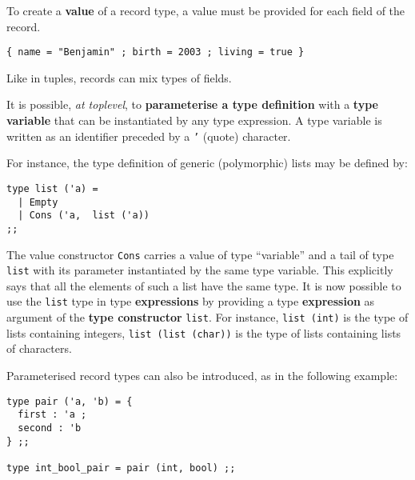 \vspace{0.2cm}

To create a {\bf value} of a record type, a value
must be provided for each field of the record.
{\scriptsize
\begin{lstlisting}
{ name = "Benjamin" ; birth = 2003 ; living = true }
\end{lstlisting}
}
Like in tuples, records can mix types of fields.

\vspace{0.5cm}

It is possible, {\em at toplevel}, to {\bf parameterise a type
  definition} with a {\bf type variable} that
can be instantiated by any type expression. A type variable is written
as an identifier preceded by a {\tt '} (quote) character.

 For instance, the type
definition of generic (polymorphic) lists may be defined by:

{\scriptsize
\begin{lstlisting}
type list ('a) =
  | Empty
  | Cons ('a,  list ('a))
;;
\end{lstlisting}
}

The value
constructor {\tt Cons} carries a value of type ``variable''
and a tail of type
{\tt list} with its parameter instantiated by the same type
variable. This explicitly says that all the elements of such a list
have the same type. It is now possible to use the {\tt list} type in
type {\bf expressions} by providing a type {\bf expression} as
argument of the {\bf type constructor} {\tt list}. For instance,
{\tt list (int)} is the type of lists containing integers,
{\tt list (list (char))} is the type of lists containing lists of
characters.

Parameterised record types can also be introduced, as in the following example:
{\scriptsize
\begin{lstlisting}
type pair ('a, 'b) = {
  first : 'a ;
  second : 'b
} ;;

type int_bool_pair = pair (int, bool) ;;
\end{lstlisting}
}

